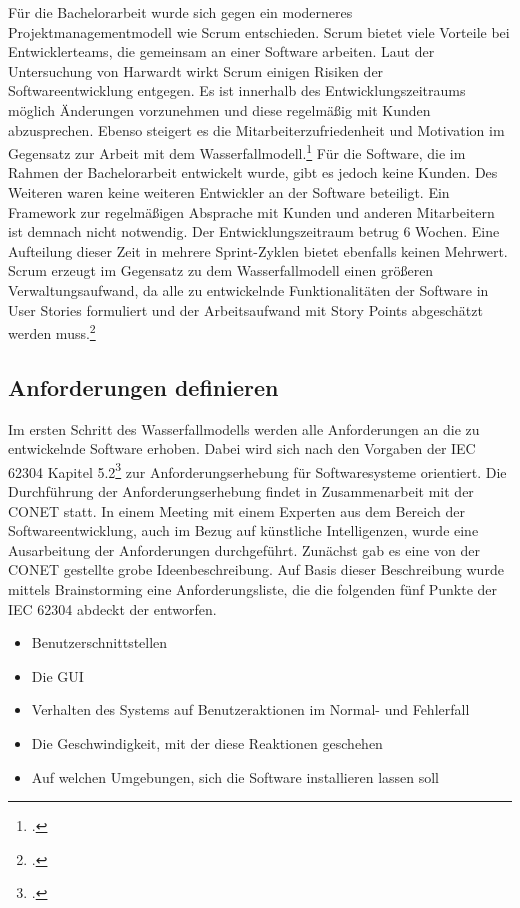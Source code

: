 Für die Bachelorarbeit wurde sich gegen ein moderneres Projektmanagementmodell wie Scrum entschieden. Scrum bietet viele Vorteile bei Entwicklerteams, die gemeinsam an einer Software arbeiten. Laut der Untersuchung von Harwardt wirkt Scrum einigen Risiken der Softwareentwicklung entgegen. Es ist innerhalb des Entwicklungszeitraums möglich Änderungen vorzunehmen und diese regelmäßig mit Kunden abzusprechen. Ebenso steigert es die Mitarbeiterzufriedenheit und Motivation im Gegensatz zur Arbeit mit dem Wasserfallmodell.\footcite{harwardt2012wasserfallmodell} Für die Software, die im Rahmen der Bachelorarbeit entwickelt wurde, gibt es jedoch keine Kunden. Des Weiteren waren keine weiteren Entwickler an der Software beteiligt. Ein Framework zur regelmäßigen Absprache mit Kunden und anderen Mitarbeitern ist demnach nicht notwendig. Der Entwicklungszeitraum betrug 6 Wochen. Eine Aufteilung dieser Zeit in mehrere Sprint-Zyklen bietet ebenfalls keinen Mehrwert. Scrum erzeugt im Gegensatz zu dem Wasserfallmodell einen größeren Verwaltungsaufwand, da alle zu entwickelnde Funktionalitäten der Software in User Stories formuliert und der Arbeitsaufwand mit Story Points abgeschätzt werden muss.\footcite{wirdemann2022scrum}

\subsection{Anforderungen definieren}
Im ersten Schritt des Wasserfallmodells werden alle Anforderungen an die zu entwickelnde Software erhoben. Dabei wird sich nach den Vorgaben der IEC 62304 Kapitel 5.2\footcite{daniel2018anforderungen} zur Anforderungserhebung für Softwaresysteme orientiert. Die Durchführung der Anforderungserhebung findet in Zusammenarbeit mit der CONET statt. In einem Meeting mit einem Experten aus dem Bereich der Softwareentwicklung, auch im Bezug auf künstliche Intelligenzen, wurde eine Ausarbeitung der Anforderungen durchgeführt. Zunächst gab es eine von der CONET gestellte grobe Ideenbeschreibung. Auf Basis dieser Beschreibung wurde mittels Brainstorming eine Anforderungsliste, die die folgenden fünf Punkte der IEC 62304 abdeckt der entworfen.

\begin{itemize}
\item Benutzerschnittstellen
\item Die GUI
\item Verhalten des Systems auf Benutzeraktionen im Normal- und Fehlerfall
\item Die Geschwindigkeit, mit der diese Reaktionen geschehen
\item Auf welchen Umgebungen, sich die Software installieren lassen soll
\end{itemize}

